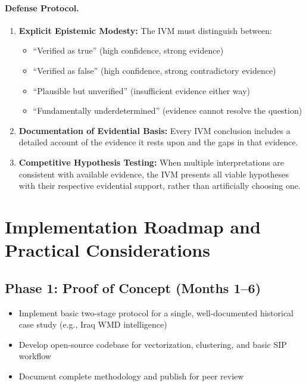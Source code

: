\documentclass[11pt,a4paper]{article}
\begin{document}
\paragraph{Defense Protocol.}

\begin{enumerate}
    \item \textbf{Explicit Epistemic Modesty:} The IVM must distinguish between:
    \begin{itemize}
        \item ``Verified as true'' (high confidence, strong evidence)
        \item ``Verified as false'' (high confidence, strong contradictory evidence)
        \item ``Plausible but unverified'' (insufficient evidence either way)
        \item ``Fundamentally underdetermined'' (evidence cannot resolve the question)
    \end{itemize}
    
    \item \textbf{Documentation of Evidential Basis:} Every IVM conclusion includes a detailed account of the evidence it rests upon and the gaps in that evidence.
    
    \item \textbf{Competitive Hypothesis Testing:} When multiple interpretations are consistent with available evidence, the IVM presents all viable hypotheses with their respective evidential support, rather than artificially choosing one.
\end{enumerate}

\section{Implementation Roadmap and Practical Considerations}

\subsection{Phase 1: Proof of Concept (Months 1--6)}

\begin{itemize}
    \item Implement basic two-stage protocol for a single, well-documented historical case study (e.g., Iraq WMD intelligence)
    \item Develop open-source codebase for vectorization, clustering, and basic SIP workflow
    \item Document complete methodology and publish for peer review
\end{itemize}
\end{document}
